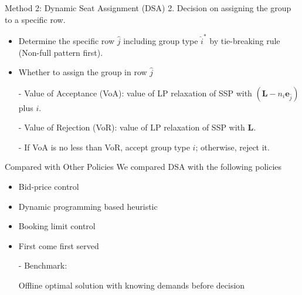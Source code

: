     \begin{frame}{Method 2: Dynamic Seat Assignment (DSA)}
      2. Decision on assigning the group to a specific row.
      \vspace{0.2cm}

      \begin{itemize}
        \item Determine the specific row $\hat{j}$ including group type $\hat{i}^{*}$ by tie-breaking rule (Non-full pattern first). 
        \item Whether to assign the group in row $\hat{j}$
        \item[-] Value of Acceptance (VoA): value of LP relaxation of SSP with $(\mathbf{L}-n_{i} \mathbf{e}_{\hat{j}})$ plus $i$.
        

        \item[-] Value of Rejection (VoR): value of LP relaxation of SSP with $\mathbf{L}$.

        \item[-] If VoA is no less than VoR, accept group type $i$; otherwise, reject it.
      \end{itemize}
    \end{frame}


    \begin{frame}{Compared with Other Policies}
      We compared DSA with the following policies 
      
      \vspace{0.5cm}
      
      \begin{itemize}
        \item Bid-price control
        \item Dynamic programming based heuristic
        \item Booking limit control
        \item First come first served
        \vspace{0.1cm}
        \item[-] Benchmark: 
        
        Offline optimal solution with knowing demands before decision
      \end{itemize}
    \end{frame}

